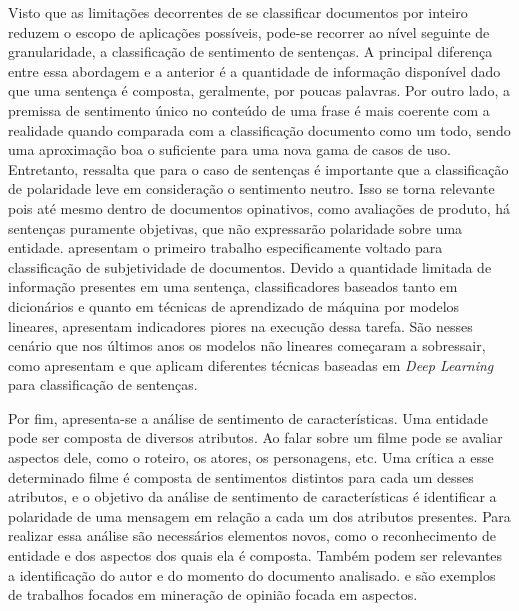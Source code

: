 Visto que as limitações decorrentes de se classificar documentos por inteiro
reduzem o escopo de aplicações possíveis, pode-se recorrer ao nível seguinte de
granularidade, a classificação de sentimento de sentenças.
A principal diferença entre essa abordagem e a anterior é a quantidade de
informação disponível dado que uma sentença é composta, geralmente, por poucas
palavras.
Por outro lado, a premissa de sentimento único no conteúdo de uma frase é mais
coerente com a realidade quando comparada com a classificação documento como um
todo, sendo uma aproximação boa o suficiente para uma nova gama de casos de uso.
Entretanto, \citet{liu15} ressalta que para o caso de sentenças é importante que
a classificação de polaridade leve em consideração o sentimento neutro.
Isso se torna relevante pois até mesmo dentro de documentos opinativos, como
avaliações de produto, há sentenças puramente objetivas, que não expressarão
polaridade sobre uma entidade.
\citet{riloff05} apresentam o primeiro trabalho especificamente voltado para
classificação de subjetividade de documentos.
Devido a quantidade limitada de informação presentes em uma sentença,
classificadores baseados tanto em dicionários e quanto em técnicas de
aprendizado de máquina por modelos lineares, apresentam indicadores piores na
execução dessa tarefa.
São nesses cenário que nos últimos anos os modelos não lineares começaram a
sobressair, como apresentam \citet{socher11} e \citet{socher13} que aplicam
diferentes técnicas baseadas em \textit{Deep Learning} para classificação de
sentenças.

Por fim, apresenta-se a análise de sentimento de características.
Uma entidade pode ser composta de diversos atributos.
Ao falar sobre um filme pode se avaliar aspectos dele, como o roteiro, os
atores, os personagens, etc.
Uma crítica a esse determinado filme é composta de sentimentos distintos para
cada um desses atributos, e o objetivo da análise de sentimento de
características é identificar a polaridade de uma mensagem em relação a cada um
dos atributos presentes.
Para realizar essa análise são necessários elementos novos, como o reconhecimento
de entidade e dos aspectos dos quais ela é composta.
Também podem ser relevantes a identificação do autor e do momento do documento
analisado.
\citet{nasukawa03} e \citet{snyder07} são exemplos de trabalhos focados em
mineração de opinião focada em aspectos.

